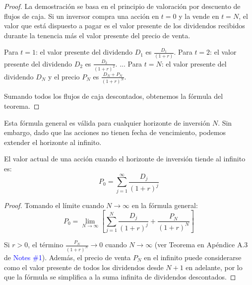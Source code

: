 \begin{proof}
La demostración se basa en el principio de valoración por descuento de flujos de caja. Si un inversor compra una acción en $t=0$ y la vende en $t=N$, el valor que está dispuesto a pagar es el valor presente de los dividendos recibidos durante la tenencia más el valor presente del precio de venta.

Para $t=1$: el valor presente del dividendo $D_1$ es $\frac{D_1}{(1+r)}$.
Para $t=2$: el valor presente del dividendo $D_2$ es $\frac{D_2}{(1+r)^2}$.
...
Para $t=N$: el valor presente del dividendo $D_N$ y el precio $P_N$ es $\frac{D_N + P_N}{(1+r)^N}$.

Sumando todos los flujos de caja descontados, obtenemos la fórmula del teorema.
\end{proof}

Esta fórmula general es válida para cualquier horizonte de inversión $N$. Sin embargo, dado que las acciones no tienen fecha de vencimiento, podemos extender el horizonte al infinito.

\begin{teorema}
El valor actual de una acción cuando el horizonte de inversión tiende al infinito es:
\begin{equation}
P_0 = \sum_{j=1}^{\infty} \frac{D_j}{(1+r)^j}
\end{equation}
\end{teorema}

\begin{proof}
Tomando el límite cuando $N \to \infty$ en la fórmula general:
$$P_0 = \lim_{N \to \infty} \left[\sum_{j=1}^{N} \frac{D_j}{(1+r)^j} + \frac{P_N}{(1+r)^N}\right]$$

Si $r > 0$, el término $\frac{P_N}{(1+r)^N} \to 0$ cuando $N \to \infty$ (ver Teorema en Apéndice A.3 de \textcolor{blue}{Notes \#1}). Además, el precio de venta $P_N$ en el infinito puede considerarse como el valor presente de todos los dividendos desde $N+1$ en adelante, por lo que la fórmula se simplifica a la suma infinita de dividendos descontados.
\end{proof}


